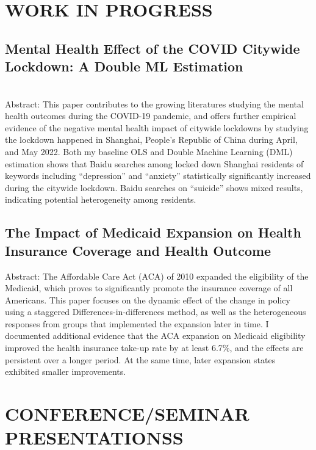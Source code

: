 \documentclass[a4paper,9pt]{extarticle}
\begin{document}

\section*{WORK IN PROGRESS}

\subsection*{Mental Health Effect of the COVID Citywide Lockdown: A Double ML Estimation} \\ 

Abstract: This paper contributes to the growing literatures studying the mental health outcomes during the COVID-19 pandemic, and offers further empirical evidence of the negative mental health impact of citywide lockdowns by studying the lockdown happened in Shanghai, People’s Republic of China during April, and May 2022. Both my baseline OLS and Double Machine Learning (DML) estimation shows that Baidu searches among locked down Shanghai residents of keywords including “depression” and “anxiety” statistically significantly increased during the citywide lockdown. Baidu searches on “suicide” shows mixed results, indicating potential heterogeneity among residents. \\

\subsection*{The Impact of Medicaid Expansion on Health Insurance Coverage and Health Outcome}
Abstract: The Affordable Care Act (ACA) of 2010 expanded the eligibility of the Medicaid, which proves to significantly promote the insurance coverage of all Americans. This paper focuses on the dynamic effect of the change in policy using a staggered Differences-in-differences method, as well as the heterogeneous responses from groups that implemented the expansion later in time. I documented additional evidence that the ACA expansion on Medicaid eligibility improved the health insurance take-up rate by at least 6.7\%, and the effects are persistent over a longer period. At the same time, later expansion states exhibited smaller improvements.

\section*{CONFERENCE/SEMINAR PRESENTATIONSS}
\end{document}
